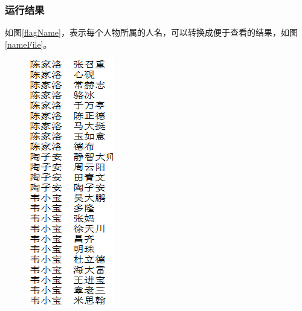 \documentclass{ctexart}
\begin{document}
	\subsubsection{运行结果}
	\par 如图\ref{flagName}，表示每个人物所属的人名，可以转换成便于查看的结果，如图\ref{nameFile}。
	\begin{figure}[H]
	\centering
	\begin{minipage}[t]{0.15\textwidth}
		\centering
		\includegraphics[width=0.9\linewidth]{pic/task5/LPA}

\end{minipage}
\end{figure}
\end{document}
